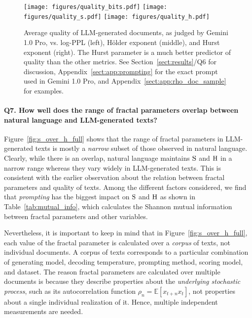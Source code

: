 \begin{figure*}[t]
    \centering
    \texttt{[image: figures/quality\_bits.pdf]}\hfill
    \texttt{[image: figures/quality\_s.pdf]}\hfill
    \texttt{[image: figures/quality\_h.pdf]}
    \caption{Average quality of LLM-generated documents, as judged by Gemini 1.0 Pro, vs. log-PPL (left), H\"older exponent (middle), and Hurst exponent (right). The Hurst parameter is a much better predictor of quality than the other metrics. See Section~\ref{sect:results}/Q6 for discussion, Appendix~\ref{sect:app:prompting} for the exact prompt used in Gemini 1.0 Pro, and Appendix~\ref{sect:app:rho_doc_sample} for examples. }
    \label{fig:quality}
\end{figure*}


\paragraph{Q7. How well does the range of fractal parameters overlap between natural language and LLM-generated texts?} 
Figure~\ref{fig:s_over_h_full} shows that the range of fractal parameters in LLM-generated texts is mostly a \emph{narrow} subset of those observed in natural language. Clearly, while there is an overlap, natural language maintains $\mathrm{S}$ and $\mathrm{H}$ in a narrow range whereas they vary widely in LLM-generated texts. This is consistent with the earlier observation about the relation between fractal parameters and quality of texts. Among the different factors considered, we find that \emph{prompting} has the biggest impact on $\mathrm{S}$ and $\mathrm{H}$ as shown in Table~\ref{tab:mutual_info}, which calculates the Shannon mutual information between fractal parameters and other variables. 

Nevertheless, it is important to keep in mind that in Figure~\ref{fig:s_over_h_full}, each value of the fractal parameter is calculated over a \emph{corpus} of texts, not individual documents. A corpus of texts corresponds to a particular combination of generating model, decoding temperature, prompting method, scoring model, and dataset. The reason fractal parameters are calculated over multiple documents is because they describe properties about the \emph{underlying stochastic process}, such as its autocorrelation function $\rho_n=\mathbb{E}[x_{t+n}x_t]$, not properties about a single individual realization of it. Hence, multiple independent measurements are needed. 


